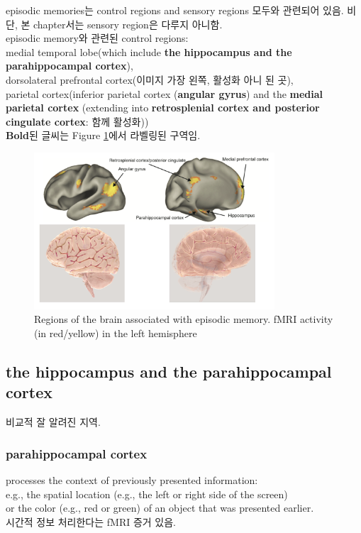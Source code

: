 \documentclass[../note.tex]{subfiles}
\begin{document}
episodic memories는 control regions
and sensory regions 모두와 관련되어 있음. 비단, 본 chapter서는 sensory region은 다루지 아니함.\\
episodic memory와 관련된 control regions:\\
medial temporal lobe(which include \textbf{the hippocampus and the parahippocampal cortex}),\\
dorsolateral prefrontal cortex(이미지 가장 왼쪽, 활성화 아니 된 곳),\\
parietal cortex(inferior
parietal cortex (\textbf{angular gyrus}) and the \textbf{medial parietal cortex} (extending
into \textbf{retrosplenial cortex and posterior cingulate cortex}: 함께 활성화))\\
\textbf{Bold}된 글씨는 Figure \ref{fig:episodic_regions}에서 라벨링된 구역임.
\begin{figure}[htbp]
  \centering
  \includegraphics[width=0.8\textwidth]{image/episodic_regions}
  \caption{Regions of the brain associated with episodic memory. fMRI activity (in red/yellow)
  in the left hemisphere}
  \label{fig:episodic_regions}
\end{figure}

\subsection{the hippocampus and the parahippocampal cortex}
비교적 잘 알려진 지역.
\subsubsection{parahippocampal cortex}
processes the context of previously presented information: \\
e.g., the spatial location (e.g., the left or right side of the screen) \\
or the color (e.g., red or green) of an object that was presented earlier.\\
시간적 정보 처리한다는 fMRI 증거 있음.
\end{document}

